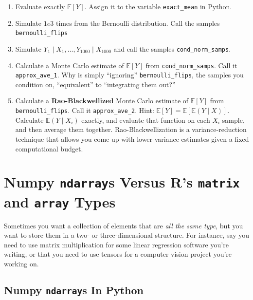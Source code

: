 \documentclass[
  12pt,
  krantz2]{krantz}
\begin{document}
\begin{enumerate}
\def\labelenumi{\alph{enumi}.}
\item
  Evaluate exactly \(\mathbb{E}[Y]\). Assign it to the variable \texttt{exact\_mean} in Python.
\item
  Simulate \(1e3\) times from the Bernoulli distribution. Call the samples \texttt{bernoulli\_flips}
\item
  Simulate \(Y_1 \mid X_1, \ldots, Y_{1000} \mid X_{1000}\) and call the samples \texttt{cond\_norm\_samps}.
\item
  Calculate a Monte Carlo estimate of \(\mathbb{E}[Y]\) from \texttt{cond\_norm\_samps}. Call it \texttt{approx\_ave\_1}. Why is simply ``ignoring'' \texttt{bernoulli\_flips}, the samples you condition on, ``equivalent'' to ``integrating them out?''
\item
  Calculate a \textbf{Rao-Blackwellized} Monte Carlo estimate of \(\mathbb{E}[Y]\) from \texttt{bernoulli\_flips}. Call it \texttt{approx\_ave\_2}. Hint: \(\mathbb{E}[Y] = \mathbb{E}[\mathbb{E}(Y \mid X) ]\). Calculate \(\mathbb{E}(Y \mid X_i)\) exactly, and evaluate that function on each \(X_i\) sample, and then average them together. Rao-Blackwellization is a variance-reduction technique that allows you come up with lower-variance estimates given a fixed computational budget.
\end{enumerate}

\hypertarget{numpy-ndarrays-versus-rs-matrix-and-array-types}{%
\chapter{\texorpdfstring{Numpy \texttt{ndarray}s Versus R's \texttt{matrix} and \texttt{array} Types}{Numpy ndarrays Versus R's matrix and array Types}}\label{numpy-ndarrays-versus-rs-matrix-and-array-types}}

Sometimes you want a collection of elements that are \emph{all the same type}, but you want to store them in a two- or three-dimensional structure. For instance, say you need to use matrix multiplication for some linear regression software you're writing, or that you need to use tensors for a computer vision project you're working on.

\hypertarget{numpy-ndarrays-in-python}{%
\section{\texorpdfstring{Numpy \texttt{ndarray}s In Python}{Numpy ndarrays In Python}}\label{numpy-ndarrays-in-python}}
\end{document}
